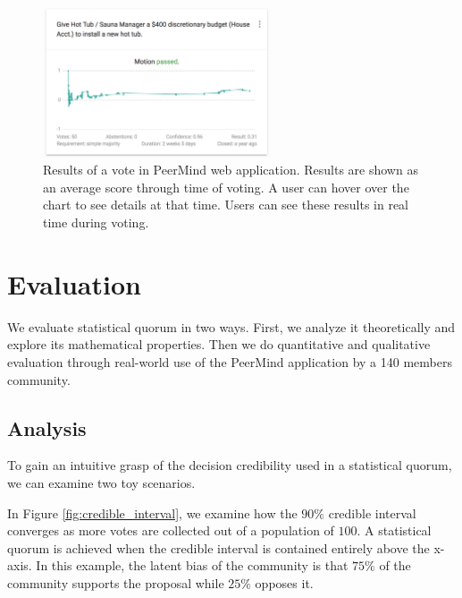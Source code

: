 \documentclass[format=acmsmall, review=true, screen=true, anonymous=true]{acmart}
\begin{document}
\begin{figure}[ht]
\centering
\includegraphics[width=0.6\textwidth]{figures/results.png}
\caption{Results of a vote in PeerMind web application. Results are shown as an average score through time of voting.
A user can hover over the chart to see details at that time. Users can see these results in real time during voting.}
\label{fig:results}
\end{figure}

\newpage

\section{Evaluation}
\label{sec:evaluation}

We evaluate statistical quorum in two ways. First, we analyze it theoretically and explore its mathematical properties.
Then we do quantitative and qualitative evaluation through real-world use of the PeerMind application by a 140 members
community.

\subsection{Analysis}


To gain an intuitive grasp of the decision credibility used in a statistical quorum, we can examine two toy scenarios.

In Figure \ref{fig:credible_interval}, we examine how the $90\%$ credible interval converges as more votes are collected out of a population of $100$.  A statistical quorum is achieved when the credible interval is contained entirely above the x-axis.  In this example, the latent bias of the community is that $75\%$ of the community supports the proposal while $25\%$ opposes it.
\end{document}
